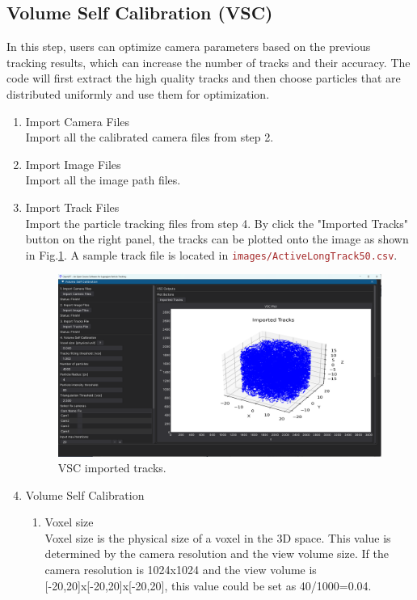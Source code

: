 \documentclass[a4paper,fleqn]{article}
\newcommand{\file}[1]{\textcolor{brown}{\texttt{#1}}}
\begin{document}
\subsection {Volume Self Calibration (VSC)}
In this step, users can optimize camera parameters based on the previous tracking results, which can increase the number of tracks and their accuracy. The code will first extract the high quality tracks and then choose particles that are distributed uniformly and use them for optimization.

\begin{enumerate}
    \item Import Camera Files\\
    Import all the calibrated camera files from step 2.

    \item Import Image Files\\
    Import all the image path files.

    \item Import Track Files \\
    Import the particle tracking files from step 4. By click the "Imported Tracks" button on the right panel, the tracks can be plotted onto the image as shown in Fig.\ref{fig:GUI_VSC_tracks}. A sample track file is located in \file{images/ActiveLongTrack50.csv}.

    \begin{figure}[h]
        \centering
        \includegraphics[width=\linewidth]{Fig/GUI_VSC_tracks.png}
        \caption{VSC imported tracks.}
        \label{fig:GUI_VSC_tracks}
    \end{figure}

    \item Volume Self Calibration\\
    \begin{enumerate}
        \item Voxel size\\
        Voxel size is the physical size of a voxel in the 3D space. This value is determined by the camera resolution and the view volume size. If the camera resolution is 1024x1024 and the view volume is [-20,20]x[-20,20]x[-20,20], this value could be set as 40/1000=0.04.
    

\end{enumerate}
\end{enumerate}
\end{document}
